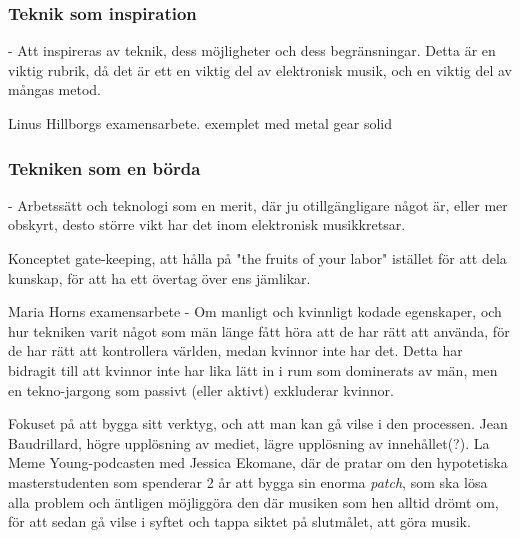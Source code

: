 \documentclass{article}
\begin{document}








\subsubsection{Teknik som inspiration}
- Att inspireras av teknik, dess möjligheter och dess begränsningar. Detta är en viktig rubrik, då det är ett
  en viktig del av elektronisk musik, och en viktig del av mångas metod. 

  Linus Hillborgs examensarbete. exemplet med metal gear solid

\subsubsection{Tekniken som en börda}
- Arbetssätt och teknologi som en merit, där ju otillgängligare något är, eller mer obskyrt, desto större vikt
  har det inom elektronisk musikkretsar. 

  Konceptet gate-keeping, att hålla på "the fruits of your labor" istället för att dela kunskap, för att ha
  ett övertag över ens jämlikar.

  Maria Horns examensarbete - Om manligt och kvinnligt kodade egenskaper, och hur tekniken varit något som män
  länge fått höra att de har rätt att använda, för de har rätt att kontrollera världen, medan kvinnor inte har
  det. Detta har bidragit till att kvinnor inte har lika lätt in i rum som dominerats av män, men en
  tekno-jargong som passivt (eller aktivt) exkluderar kvinnor. 

  Fokuset på att bygga sitt verktyg, och att man kan gå vilse i den processen. Jean Baudrillard, högre
  upplösning av mediet, lägre upplösning av innehållet(?). 
  La Meme Young-podcasten med Jessica Ekomane, där de pratar om den hypotetiska masterstudenten som spenderar
  2 år att bygga sin enorma \emph{patch}, som ska lösa alla problem och äntligen möjliggöra den där musiken
  som hen alltid drömt om, för att sedan gå vilse i syftet och tappa siktet på slutmålet, att göra musik. 
\end{document}
